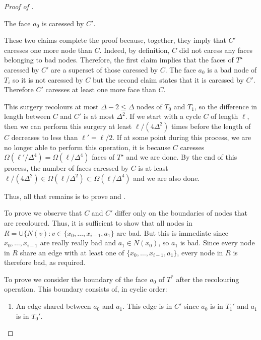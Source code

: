 \documentclass[a4paper,UKenglish]{socg-lipics-v2019}
\newcommand{\dual}[1]{{#1}^\star}
\begin{document}
\begin{proof}[Proof of ]
\begin{enumerate}
   \begin{clm}
      The face $a_0$ is caressed by $C'$.
   \end{clm}

   These two claims complete the proof because, together,
   they imply that $C'$ caresses one more node than $C$.  Indeed, by
   definition, $C$ did not caress any faces belonging to bad nodes.
   Therefore, the first claim implies that the faces of $\dual{T}$
   caressed by $C'$ are a superset of those caressed by $C$.  The face
   $a_0$ is a bad node of $T_i$ so it is not caressed by $C$ but the
   second claim states that it is caressed by $C'$.  Therefore $C'$
   caresses at least one more face than $C$.

   This surgery recolours at most $\Delta-2\le \Delta$ nodes of $T_0$
   and $T_1$, so the difference in length between $C$ and $C'$
   is at most $\Delta^2$.  If we start with a cycle $C$
   of length $\ell$, then we can perform this surgery at least
   $\ell/(4\Delta^2)$ times before the length of $C$ decreases
   to less than $\ell'=\ell/2$. If at some point during this process,
   we are no longer able to perform this operation, it is because
   $C$ caresses $\Omega(\ell'/\Delta^4)=\Omega(\ell/\Delta^4)$
   faces of $\dual{T}$ and we are done.  By the end of this
   process, the number of faces caressed by $C$ is at least
   $\ell/(4\Delta^2)\in\Omega(\ell/\Delta^2)\subset\Omega(\ell/\Delta^4)$
   and we are also done.

   Thus, all that remains is to prove  and
   .

   To prove  we observe that $C$ and $C'$ differ only on
   the boundaries of nodes that are recoloured.  Thus, it is sufficient
   to show that all nodes in $R=\cup\{N(v): v\in\{x_0,\ldots,x_{i-1},a_1\}$
   are bad.  But this is immediate since $x_0,\ldots,x_{i-1}$ are really
   really bad and $a_1\in N(x_0)$, so $a_1$ is bad.  Since every node in $R$
   share an edge with at least one of $\{x_0,\ldots,x_{i-1},a_1\}$, every
   node in $R$ is therefore bad, as required.

   To prove  we consider the boundary of the face
   $a_0$ of $T^*$ after the recolouring operation.  This boundary
   consists of, in cyclic order:
   \begin{enumerate}
     \item  An edge shared between $a_0$ and $a_1$.  This edge is in
       $C'$ since $a_0$ is in $T_1'$ and $a_1$ is in $T_0'$.


\end{enumerate}
\end{enumerate}
\end{proof}
\end{document}
